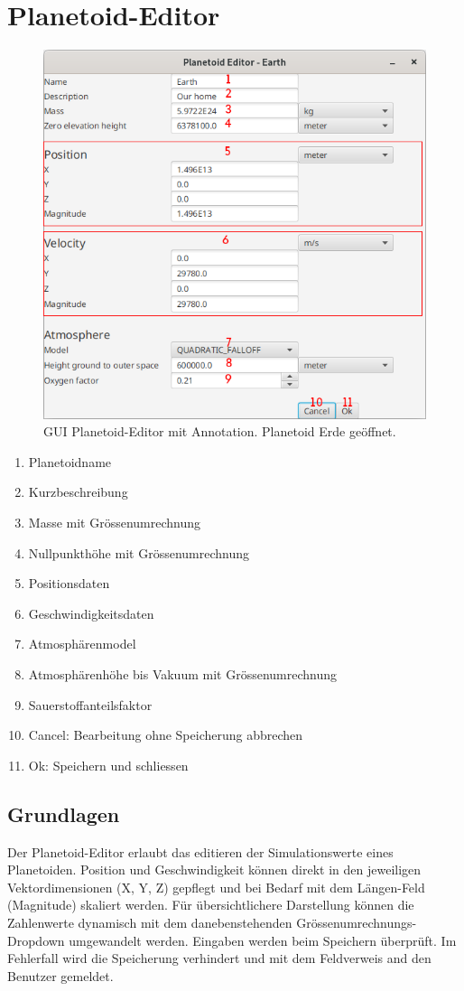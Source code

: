 \hypertarget{planetoideditor}{\section{Planetoid-Editor}}

\begin{figure}[H]
	\centering
	\includegraphics[width=12cm]{res/planetoideditor.png}
	\caption{GUI Planetoid-Editor mit Annotation. Planetoid Erde geöffnet.}
\end{figure}

\begin{enumerate}[noitemsep]
	\item Planetoidname
	\item Kurzbeschreibung
	\item Masse mit Grössenumrechnung
	\item Nullpunkthöhe mit Grössenumrechnung
	\item Positionsdaten
	\item Geschwindigkeitsdaten
	\item Atmosphärenmodel
	\item Atmosphärenhöhe bis Vakuum mit Grössenumrechnung
	\item Sauerstoffanteilsfaktor
	\item Cancel: Bearbeitung ohne Speicherung abbrechen
	\item Ok: Speichern und schliessen
\end{enumerate}

\subsection{Grundlagen}
Der Planetoid-Editor erlaubt das editieren der Simulationswerte eines Planetoiden. Position und Geschwindigkeit können direkt in den jeweiligen Vektordimensionen (X, Y, Z) gepflegt und bei Bedarf mit dem Längen-Feld (Magnitude) skaliert werden. Für übersichtlichere Darstellung können die Zahlenwerte dynamisch mit dem danebenstehenden Grössenumrechnungs-Dropdown umgewandelt werden. Eingaben werden beim Speichern überprüft. Im Fehlerfall wird die Speicherung verhindert und mit dem Feldverweis and den Benutzer gemeldet.

